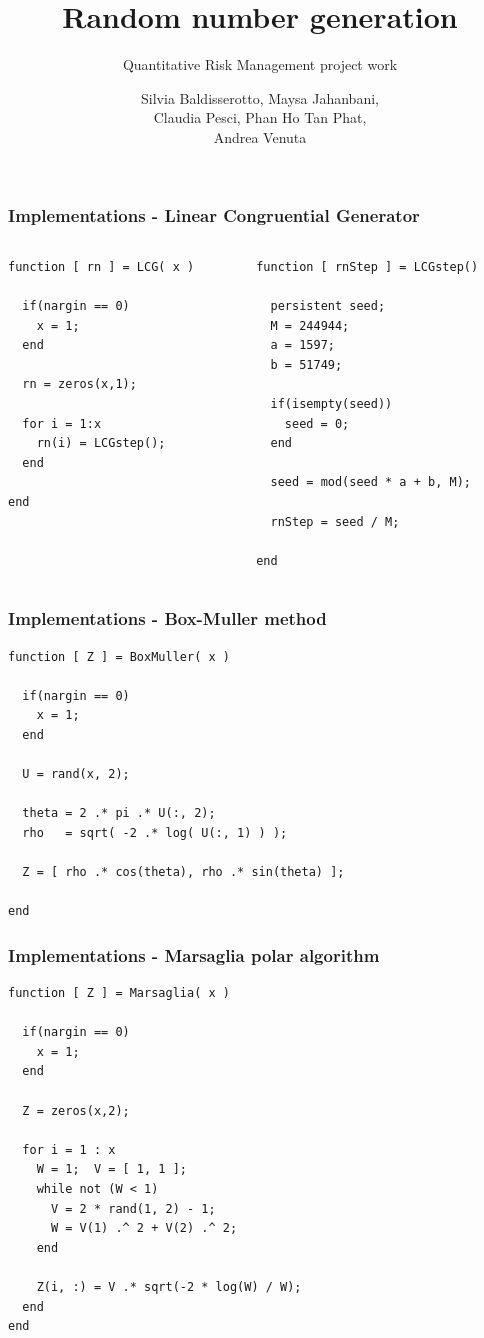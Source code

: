 \documentclass[10pt, compress]{beamer}
\title{Random number generation}
\subtitle{Quantitative Risk Management project work}
\date{}
\author{Silvia Baldisserotto, Maysa Jahanbani, \\ Claudia Pesci, Phan Ho Tan Phat, \\ Andrea Venuta}
\institute{Università degli Studi di Firenze - Finance and Risk Management}
\begin{document}
\maketitle

\begin{frame}[fragile]
	\frametitle{Implementations - Linear Congruential Generator}
	\begin{columns}[t]
		\begin{column}{5cm}
	
			\begin{verbatim}
function [ rn ] = LCG( x ) 

  if(nargin == 0)
    x = 1;
  end
  
  rn = zeros(x,1);
  
  for i = 1:x
    rn(i) = LCGstep();
  end

end
			\end{verbatim}
		\end{column}
		\begin{column}{5cm}
			\begin{verbatim}
function [ rnStep ] = LCGstep()

  persistent seed;
  M = 244944;
  a = 1597;
  b = 51749;
  
  if(isempty(seed))
    seed = 0;
  end
  
  seed = mod(seed * a + b, M);
  
  rnStep = seed / M;

end
			\end{verbatim}
		\end{column}
	\end{columns}
\end{frame}

\begin{frame}[fragile]
	\frametitle{Implementations - Box-Muller method}
	\begin{verbatim}
function [ Z ] = BoxMuller( x )

  if(nargin == 0)
    x = 1;
  end

  U = rand(x, 2);
  
  theta = 2 .* pi .* U(:, 2);
  rho   = sqrt( -2 .* log( U(:, 1) ) );
  
  Z = [ rho .* cos(theta), rho .* sin(theta) ];

end
	\end{verbatim}
\end{frame}

\begin{frame}[fragile]
	\frametitle{Implementations - Marsaglia polar algorithm}
	\begin{verbatim}
function [ Z ] = Marsaglia( x )

  if(nargin == 0)
    x = 1;
  end

  Z = zeros(x,2);
  
  for i = 1 : x
    W = 1;  V = [ 1, 1 ];
    while not (W < 1)
      V = 2 * rand(1, 2) - 1;
      W = V(1) .^ 2 + V(2) .^ 2;
    end
    
    Z(i, :) = V .* sqrt(-2 * log(W) / W);
  end
end
	\end{verbatim}
\end{frame}
\end{document}

